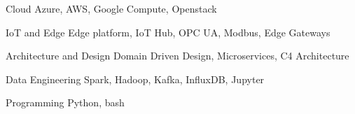 


\begin{cvskills}


\cvskill
{Cloud} %
{Azure, AWS, Google Compute, Openstack} %

\cvskill
{IoT and Edge} %
{Edge platform, IoT Hub, OPC UA, Modbus, Edge Gateways} %


\cvskill
{Architecture and Design} %
{Domain Driven Design, Microservices, C4 Architecture} %


\cvskill
{Data Engineering} %
{Spark, Hadoop, Kafka, InfluxDB, Jupyter} %


\cvskill
{Programming} %
{Python, bash} %


\end{cvskills}
